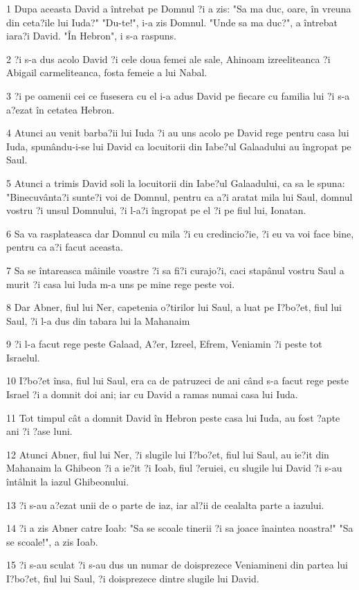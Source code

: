 \par 1 Dupa aceasta David a întrebat pe Domnul ?i a zis: "Sa ma duc, oare, în vreuna din ceta?ile lui Iuda?" "Du-te!", i-a zis Domnul. "Unde sa ma duc?", a întrebat iara?i David. "În Hebron", i s-a raspuns.
\par 2 ?i s-a dus acolo David ?i cele doua femei ale sale, Ahinoam izreeliteanca ?i Abigail carmeliteanca, fosta femeie a lui Nabal.
\par 3 ?i pe oamenii cei ce fusesera cu el i-a adus David pe fiecare cu familia lui ?i s-a a?ezat în cetatea Hebron.
\par 4 Atunci au venit barba?ii lui Iuda ?i au uns acolo pe David rege pentru casa lui Iuda, spunându-i-se lui David ca locuitorii din Iabe?ul Galaadului au îngropat pe Saul.
\par 5 Atunci a trimis David soli la locuitorii din Iabe?ul Galaadului, ca sa le spuna: "Binecuvânta?i sunte?i voi de Domnul, pentru ca a?i aratat mila lui Saul, domnul vostru ?i unsul Domnului, ?i l-a?i îngropat pe el ?i pe fiul lui, Ionatan.
\par 6 Sa va rasplateasca dar Domnul cu mila ?i cu credincio?ie, ?i eu va voi face bine, pentru ca a?i facut aceasta.
\par 7 Sa se întareasca mâinile voastre ?i sa fi?i curajo?i, caci stapânul vostru Saul a murit ?i casa lui luda m-a uns pe mine rege peste voi.
\par 8 Dar Abner, fiul lui Ner, capetenia o?tirilor lui Saul, a luat pe I?bo?et, fiul lui Saul, ?i l-a dus din tabara lui la Mahanaim
\par 9 ?i l-a facut rege peste Galaad, A?er, Izreel, Efrem, Veniamin ?i peste tot Israelul.
\par 10 I?bo?et însa, fiul lui Saul, era ca de patruzeci de ani când s-a facut rege peste Israel ?i a domnit doi ani; iar cu David a ramas numai casa lui Iuda.
\par 11 Tot timpul cât a domnit David în Hebron peste casa lui Iuda, au fost ?apte ani ?i ?ase luni.
\par 12 Atunci Abner, fiul lui Ner, ?i slugile lui I?bo?et, fiul lui Saul, au ie?it din Mahanaim la Ghibeon ?i a ie?it ?i Ioab, fiul ?eruiei, cu slugile lui David ?i s-au întâlnit la iazul Ghibeonului.
\par 13 ?i s-au a?ezat unii de o parte de iaz, iar al?ii de cealalta parte a iazului.
\par 14 ?i a zis Abner catre Ioab: "Sa se scoale tinerii ?i sa joace înaintea noastra!" "Sa se scoale!", a zis Ioab.
\par 15 ?i s-au sculat ?i s-au dus un numar de doisprezece Veniamineni din partea lui I?bo?et, fiul lui Saul, ?i doisprezece dintre slugile lui David.

